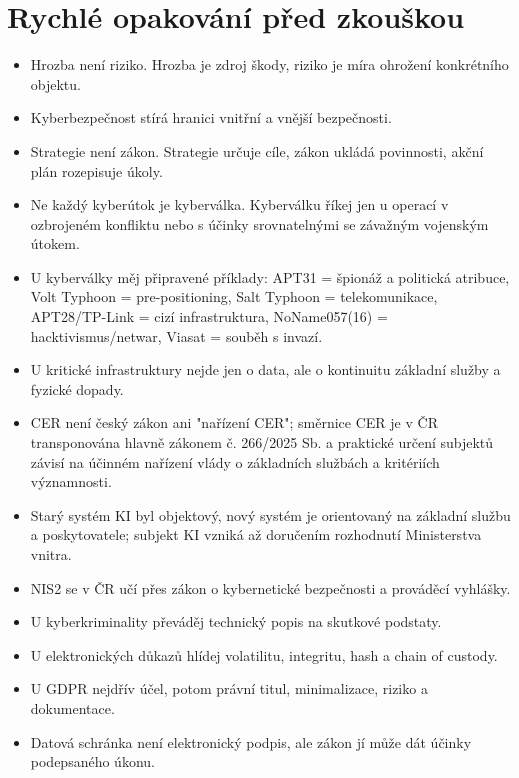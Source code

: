 \documentclass[11pt,a4paper]{article}
\begin{document}
\section*{Rychlé opakování před zkouškou}
\begin{itemize}
  \item Hrozba není riziko. Hrozba je zdroj škody, riziko je míra ohrožení konkrétního objektu.
  \item Kyberbezpečnost stírá hranici vnitřní a vnější bezpečnosti.
  \item Strategie není zákon. Strategie určuje cíle, zákon ukládá povinnosti, akční plán rozepisuje úkoly.
  \item Ne každý kyberútok je kyberválka. Kyberválku říkej jen u operací v ozbrojeném konfliktu nebo s účinky srovnatelnými se závažným vojenským útokem.
  \item U kyberválky měj připravené příklady: APT31 = špionáž a politická atribuce, Volt Typhoon = pre-positioning, Salt Typhoon = telekomunikace, APT28/TP-Link = cizí infrastruktura, NoName057(16) = hacktivismus/netwar, Viasat = souběh s invazí.
  \item U kritické infrastruktury nejde jen o data, ale o kontinuitu základní služby a fyzické dopady.
  \item CER není český zákon ani "nařízení CER"; směrnice CER je v ČR transponována hlavně zákonem č. 266/2025 Sb. a praktické určení subjektů závisí na účinném nařízení vlády o základních službách a kritériích významnosti.
  \item Starý systém KI byl objektový, nový systém je orientovaný na základní službu a poskytovatele; subjekt KI vzniká až doručením rozhodnutí Ministerstva vnitra.
  \item NIS2 se v ČR učí přes zákon o kybernetické bezpečnosti a prováděcí vyhlášky.
  \item U kyberkriminality převáděj technický popis na skutkové podstaty.
  \item U elektronických důkazů hlídej volatilitu, integritu, hash a chain of custody.
  \item U GDPR nejdřív účel, potom právní titul, minimalizace, riziko a dokumentace.
  \item Datová schránka není elektronický podpis, ale zákon jí může dát účinky podepsaného úkonu.
\end{itemize}
\end{document}
